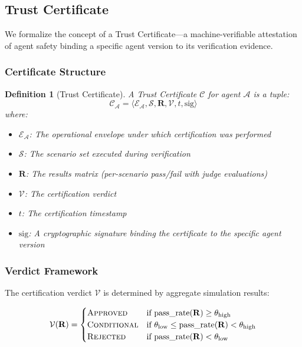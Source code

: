 \documentclass[11pt,a4paper]{article}
\newtheorem{definition}{Definition}[section]
\newcommand{\agent}{\mathcal{A}}
\newcommand{\env}{\mathcal{E}}
\newcommand{\scenario}{\mathcal{S}}
\newcommand{\verdict}{\mathcal{V}}
\newcommand{\cert}{\mathcal{C}}
\begin{document}
\subsection{Trust Certificate}
\label{sec:safety-certificate}

We formalize the concept of a Trust Certificate---a machine-verifiable
attestation of agent safety binding a specific agent version to its
verification evidence.

\subsubsection{Certificate Structure}

\begin{definition}[Trust Certificate]
  A Trust Certificate $\cert$ for agent $\agent$ is a tuple:
  \begin{equation}
    \cert_\agent = \langle \env_\agent, \scenario, \mathbf{R},
      \verdict, t, \text{sig} \rangle
  \end{equation}
  where:
  \begin{itemize}
    \item $\env_\agent$: The operational envelope under which
      certification was performed
    \item $\scenario$: The scenario set executed during verification
    \item $\mathbf{R}$: The results matrix (per-scenario pass/fail
      with judge evaluations)
    \item $\verdict$: The certification verdict
    \item $t$: The certification timestamp
    \item $\text{sig}$: A cryptographic signature binding the
      certificate to the specific agent version
  \end{itemize}
\end{definition}

\subsubsection{Verdict Framework}

The certification verdict $\verdict$ is determined by aggregate
simulation results:

\begin{equation}
  \verdict(\mathbf{R}) = \begin{cases}
    \textsc{Approved} & \text{if } \text{pass\_rate}(\mathbf{R})
      \geq \theta_{\text{high}} \\
    \textsc{Conditional} & \text{if } \theta_{\text{low}} \leq
      \text{pass\_rate}(\mathbf{R}) < \theta_{\text{high}} \\
    \textsc{Rejected} & \text{if } \text{pass\_rate}(\mathbf{R})
      < \theta_{\text{low}}
  \end{cases}
\end{equation}
\end{document}
